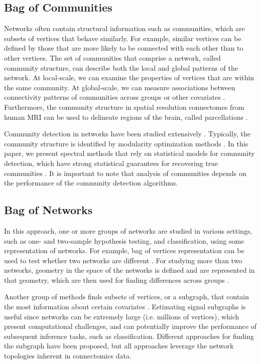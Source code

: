 \subsection{Bag of Communities}
Networks often contain structural information such as communities, which are subsets of vertices that behave similarly. For example, similar vertices can be defined by those that are more likely to be connected with each other than to other vertices.
The set of communities that comprise a network, called community structure, can describe both the local and global patterns of the network. At local-scale, we can examine the properties of vertices that are within the same community. At global-scale, we can measure associations between connectivity patterns of communities across groups or other covariates \citep{faskowitz2018weighted, kim2019graph, arroyo2020simultaneous}. Furthermore, the community structure in spatial resolution connectomes from human MRI can be used to delineate regions of the brain, called parcellations \citep{thirion2014fmri}.

Community detection in networks have been studied extensively \citep{newman2013spectral, fortunato2016community}. Typically, the community structure is identified by modularity optimization methods \citep{clauset2004finding, blondel2008fast}. In this paper, we present spectral methods that rely on statistical models for community detection, which have strong statistical guarantees for recovering true communities \citep{sussman2012consistent, lyzinski2016community, athreya2017statistical, arroyo2019inference}.
It is important to note that analysis of communities depends on the performance of the community detection algorithms.

\subsection{Bag of Networks}
In this approach, one or more groups of networks are studied in various settings, such as one- and two-sample hypothesis testing, and classification, using some representation of networks. For example, bag of vertices representation can be used to test whether two networks are different \citep{tang2017nonparametric, tang2017semiparametric}. For studying more than two networks, geometry in the space of the networks is defined and are represented in that geometry, which are then used for finding differences across groups \citep{ginestet2017hypothesis, xia2019matrix, arroyo2019inference}.

Another group of methods finds subsets of vertices, or a subgraph, that contain the most information about certain covariates \citep{vogelstein2012graph, wang2018signal,  relion2019network, wang2019symmetric, guha2020bayesian}. Estimating signal subgraphs is useful since networks can be extremely large (i.e. millions of vertices), which present computational challenges, and can potentially improve the performance of subsequent inference tasks, such as classification. 
Different approaches for finding the subgraph have been proposed, but all approaches leverage the network topologies inherent in connectomics data. 

